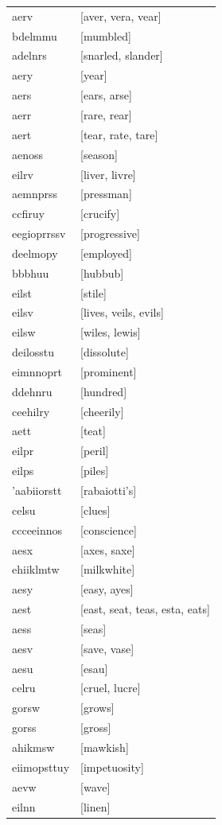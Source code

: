 \documentclass{article}
\begin{document}
\begin{tabular}{ll}
aerv & [aver, vera, vear] \\
bdelmmu & [mumbled] \\
adelnrs & [snarled, slander] \\
aery & [year] \\
aers & [ears, arse] \\
aerr & [rare, rear] \\
aert & [tear, rate, tare] \\
aenoss & [season] \\
eilrv & [liver, livre] \\
aemnprss & [pressman] \\
ccfiruy & [crucify] \\
eegioprrssv & [progressive] \\
deelmopy & [employed] \\
bbbhuu & [hubbub] \\
eilst & [stile] \\
eilsv & [lives, veils, evils] \\
eilsw & [wiles, lewis] \\
deilosstu & [dissolute] \\
eimnnoprt & [prominent] \\
ddehnru & [hundred] \\
ceehilry & [cheerily] \\
aett & [teat] \\
eilpr & [peril] \\
eilps & [piles] \\
'aabiiorstt & [rabaiotti's] \\
celsu & [clues] \\
ccceeinnos & [conscience] \\
aesx & [axes, saxe] \\
ehiiklmtw & [milkwhite] \\
aesy & [easy, ayes] \\
aest & [east, seat, teas, esta, eats] \\
aess & [seas] \\
aesv & [save, vase] \\
aesu & [esau] \\
celru & [cruel, lucre] \\
gorsw & [grows] \\
gorss & [gross] \\
ahikmsw & [mawkish] \\
eiimopsttuy & [impetuosity] \\
aevw & [wave] \\
eilnn & [linen] \\

\end{tabular}
\end{document}
